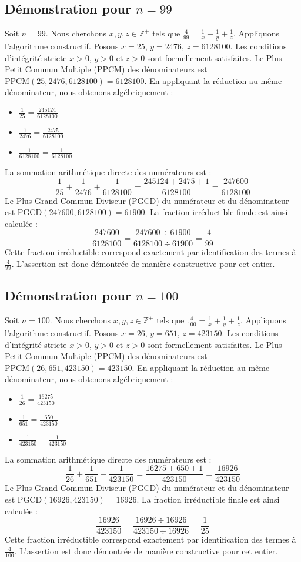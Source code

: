 \documentclass[11pt,a4paper]{article}
\begin{document}
\subsection{Démonstration pour $n = 99$}
Soit $n = 99$. Nous cherchons $x, y, z \in \mathbb{Z}^{+}$ tels que $\frac{4}{99} = \frac{1}{x} + \frac{1}{y} + \frac{1}{z}$.
Appliquons l'algorithme constructif. Posons $x = 25$, $y = 2476$, $z = 6128100$.
Les conditions d'intégrité stricte $x > 0$, $y > 0$ et $z > 0$ sont formellement satisfaites.
Le Plus Petit Commun Multiple (PPCM) des dénominateurs est $\text{PPCM}(25, 2476, 6128100) = 6128100$.
En appliquant la réduction au même dénominateur, nous obtenons algébriquement :
\begin{itemize}
    \item $\frac{1}{25} = \frac{245124}{6128100}$
    \item $\frac{1}{2476} = \frac{2475}{6128100}$
    \item $\frac{1}{6128100} = \frac{1}{6128100}$
\end{itemize}
La sommation arithmétique directe des numérateurs est :
$$ \frac{1}{25} + \frac{1}{2476} + \frac{1}{6128100} = \frac{245124 + 2475 + 1}{6128100} = \frac{247600}{6128100} $$
Le Plus Grand Commun Diviseur (PGCD) du numérateur et du dénominateur est $\text{PGCD}(247600, 6128100) = 61900$.
La fraction irréductible finale est ainsi calculée :
$$ \frac{247600}{6128100} = \frac{247600 \div 61900}{6128100 \div 61900} = \frac{4}{99} $$
Cette fraction irréductible correspond exactement par identification des termes à $\frac{4}{99}$. L'assertion est donc démontrée de manière constructive pour cet entier.

\subsection{Démonstration pour $n = 100$}
Soit $n = 100$. Nous cherchons $x, y, z \in \mathbb{Z}^{+}$ tels que $\frac{4}{100} = \frac{1}{x} + \frac{1}{y} + \frac{1}{z}$.
Appliquons l'algorithme constructif. Posons $x = 26$, $y = 651$, $z = 423150$.
Les conditions d'intégrité stricte $x > 0$, $y > 0$ et $z > 0$ sont formellement satisfaites.
Le Plus Petit Commun Multiple (PPCM) des dénominateurs est $\text{PPCM}(26, 651, 423150) = 423150$.
En appliquant la réduction au même dénominateur, nous obtenons algébriquement :
\begin{itemize}
    \item $\frac{1}{26} = \frac{16275}{423150}$
    \item $\frac{1}{651} = \frac{650}{423150}$
    \item $\frac{1}{423150} = \frac{1}{423150}$
\end{itemize}
La sommation arithmétique directe des numérateurs est :
$$ \frac{1}{26} + \frac{1}{651} + \frac{1}{423150} = \frac{16275 + 650 + 1}{423150} = \frac{16926}{423150} $$
Le Plus Grand Commun Diviseur (PGCD) du numérateur et du dénominateur est $\text{PGCD}(16926, 423150) = 16926$.
La fraction irréductible finale est ainsi calculée :
$$ \frac{16926}{423150} = \frac{16926 \div 16926}{423150 \div 16926} = \frac{1}{25} $$
Cette fraction irréductible correspond exactement par identification des termes à $\frac{4}{100}$. L'assertion est donc démontrée de manière constructive pour cet entier.
\end{document}
